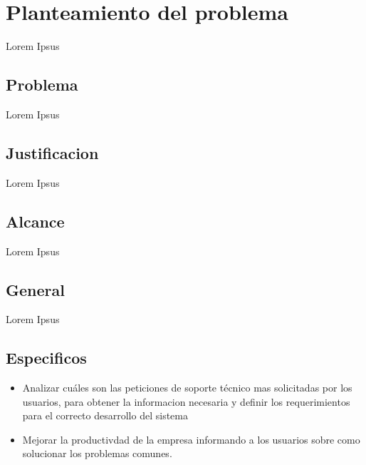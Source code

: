 \documentclass[preprint,12pt]{elsarticle}
\begin{document}

\section{Planteamiento del problema}
Lorem Ipsus


\subsection {\textbf{Problema}}
Lorem Ipsus


\subsection {\textbf{Justificacion}}

Lorem Ipsus


\subsection {\textbf{Alcance}}
Lorem Ipsus




\subsection{\textbf{General}}

Lorem Ipsus


\subsection{\textbf{Especificos}}

\begin{itemize}

\item Analizar cuáles son las peticiones de soporte técnico mas solicitadas por los usuarios, para obtener la informacion necesaria y definir los requerimientos para el correcto desarrollo del sistema
\item Mejorar la productivdad de la empresa informando a los usuarios sobre como solucionar los problemas comunes.
\end{itemize}
\end{document}
